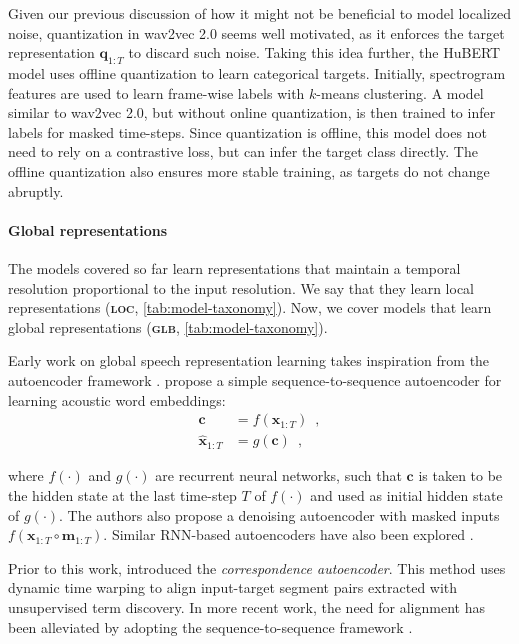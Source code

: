 {Given our previous discussion of how it might not be beneficial to model localized noise, quantization in wav2vec 2.0 seems well motivated, as it enforces the target representation $\mathbf{q}_{1:T}$ to discard such noise. Taking this idea further, the HuBERT model \parencite{hsu_hubert_2021} uses offline quantization to learn categorical targets. Initially, spectrogram features are used to learn frame-wise labels with $k$-means clustering. A model similar to wav2vec 2.0, but without online quantization, is then trained to infer labels for masked time-steps. Since quantization is offline, this model does not need to rely on a contrastive loss, but can infer the target class directly. The offline quantization also ensures more stable training, as targets do not change abruptly.


\paragraph{Global representations}
The models covered so far learn representations that maintain a temporal resolution proportional to the input resolution. We say that they learn local representations (\textbf{\textsc{loc}}, \cref{tab:model-taxonomy}). Now, we cover models that learn global representations (\textbf{\textsc{glb}}, \cref{tab:model-taxonomy}).
 
Early work on global speech representation learning takes inspiration from the autoencoder framework \parencite{kramer_nonlinear_1991}. \textcite{chung_audio_2016} propose a simple sequence-to-sequence autoencoder for learning acoustic word embeddings:
\begin{align}\label{eq_brief:dec-aw2v}
    \mathbf{c} &= f(\mathbf{x}_{1:T}) \enspace , \\
    \hat{\mathbf{x}}_{1:T} &= g(\mathbf{c}) \enspace ,
\end{align}

\noindent where $f(\cdot)$ and $g(\cdot)$ are recurrent neural networks, such that $\mathbf{c}$ is taken to be the hidden state at the last time-step $T$ of $f(\cdot)$ and used as initial hidden state of $g(\cdot)$. 
The authors also propose a denoising autoencoder with masked inputs $f(\mathbf{x}_{1:T} \circ \mathbf{m}_{1:T})$. Similar RNN-based autoencoders have also been explored \parencite{kamper_truly_2019, holzenberger_learning_2018}.

Prior to this work, \textcite{kamper_unsupervised_2015, renshaw_comparison_2015} introduced the \textit{correspondence autoencoder}. This method uses dynamic time warping to align input-target segment pairs extracted with unsupervised term discovery. In more recent work, the need for alignment has been alleviated by adopting the sequence-to-sequence framework \parencite{kamper_truly_2019, jacobs_acoustic_2021}.

}
